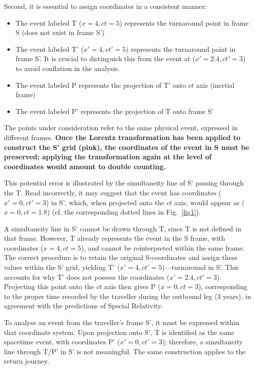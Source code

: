 \documentclass[a4paper,fleqn]{cas-sc}
\begin{document}
Second, it is essential to assign coordinates in a consistent manner:
		\begin{itemize}
			\item The event labeled T ($x = 4, ct = 5$) represents the turnaround point in frame S (does not exist in frame S')
			\item The event labeled T' ($x' = 4, ct'  = 5$) represents the turnaround point in frame S'. It is crucial to distinguish this from the event at ($x' = 2.4, ct' = 3$) to avoid conflation in the analysis.
			\item The event labeled P represents the projection of T' onto $ct$ axis (inertial frame)
			\item The event labeled P' represents the projection of T onto frame S'
		\end{itemize}
The points under consideration refer to the same physical event, expressed in different frames. \textbf{Once the Lorentz transformation has been applied to construct the S' grid (pink), the coordinates of the event in S must be preserved; applying the transformation again at the level of coordinates would amount to double counting.}

This potential error is illustrated by the simultaneity line of S' passing through the T. Read incorrectly, it may suggest that the event has coordinates ($x' = 0, ct' =3$) in S', which, when projected onto the $ct$ axis, would appear as ($x = 0, ct = 1.8$) (cf. the corresponding dotted lines in Fig.~\ref{fig1}). 

A simultaneity line in S' cannot be drawn through T, since T is not defined in that frame. However, T already represents the event in the S frame, with coordinates ($x = 4, ct = 5$), and cannot be reinterpreted within the same frame. The correct procedure is to retain the original S-coordinates and assign these values within the S' grid, yielding T' ($x' = 4, ct' = 5$)—turnaround in S'. This accounts for why T' does not possess the coordinates ($x' = 2.4, ct' = 3$). Projecting this point onto the $ct$ axis then gives P ($x = 0, ct = 3$), corresponding to the proper time recorded by the traveller during the outbound leg (3 years), in agreement with the predictions of Special Relativity.

To analyse an event from the traveller’s frame S', it must be expressed within that coordinate system. Upon projection onto S', T is identified as the same spacetime event, with coordinates P' ($x'=0, ct'=3$); therefore, a simultaneity line through T/P' in S' is not meaningful.
 The same construction applies to the return journey.
\end{document}
